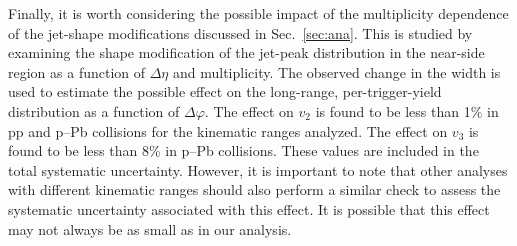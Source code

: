 Finally, it is worth considering the possible impact of the multiplicity dependence of the jet-shape modifications discussed in Sec.~\ref{sec:ana}. This is studied by examining the shape modification of the jet-peak distribution in the near-side region as a function of $\Delta\eta$ and  multiplicity. The observed change in the width is used to estimate the possible effect on the long-range, per-trigger-yield distribution as a function of $\Delta\varphi$. The effect on $v_2$ is found to be less than 1$\%$ in pp and p--Pb collisions for the kinematic ranges analyzed. The effect on $v_3$ is found to be less than 8\% in p--Pb collisions. These values are included in the total systematic uncertainty. However, it is important to note that other analyses with different kinematic ranges should also perform a similar check to assess the systematic uncertainty associated with this effect. It is possible that this effect may not always be as small as in our analysis.





